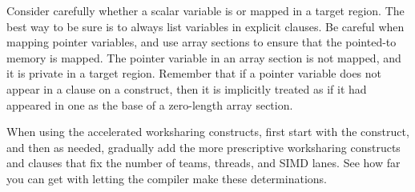 
Consider carefully whether a scalar variable is  or mapped in a
target region.  The best way to be sure is to always list variables in
explicit clauses.  Be careful when mapping pointer variables,
and use array sections to ensure that the pointed-to memory is mapped.
The pointer variable in an array section is not mapped,
and it is private in a target region.  
Remember that if a pointer
variable does not appear in a clause on a  construct, then
it is implicitly treated as if it had appeared in one as the base
of a zero-length array section.

When using the accelerated worksharing constructs, first start with
the  construct, and then as needed, gradually add
the more prescriptive worksharing constructs and clauses that fix the
number of teams, threads, and SIMD lanes.  See how far you can get with letting
the compiler make these determinations.  






